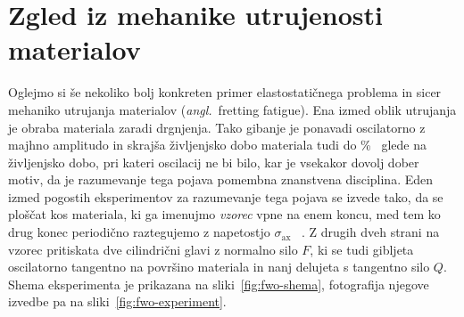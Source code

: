 \documentclass[12pt,a4paper,twoside]{article}
\theoremstyle{definition} %
\theoremstyle{plain} %
\numberwithin{equation}{section}
\newcommand{\sax}{\ensuremath{\sigma_{\text{ax}}}}
\newcommand{\ang}[1]{(\textit{angl.}\ #1)}
\begin{document}
\section{Zgled iz mehanike utrujenosti materialov}
\label{sec:fwo}
Oglejmo si še nekoliko bolj konkreten primer elastostatičnega problema in sicer mehaniko utrujanja
materialov \ang{fretting fatigue}.  Ena izmed oblik utrujanja je obraba materiala zaradi drgnjenja.
Tako gibanje je ponavadi oscilatorno z majhno amplitudo in skrajša življenjsko dobo materiala tudi
do \unit[50]{\%}~\cite{jeung2015crack} glede na življenjsko dobo, pri kateri oscilacij ne bi bilo,
kar je vsekakor dovolj dober motiv, da je razumevanje tega pojava pomembna znanstvena disciplina.
Eden izmed pogostih eksperimentov za razumevanje tega pojava se izvede tako, da se ploščat kos
materiala, ki ga imenujmo \emph{vzorec} vpne na enem koncu, med tem ko drug konec periodično
raztegujemo z napetostjo $\sax$ ~\cite{hojjati2014prediction}. Z drugih dveh strani na vzorec
pritiskata dve cilindrični glavi z normalno silo $F$, ki se tudi gibljeta oscilatorno tangentno na
površino materiala in nanj delujeta s tangentno silo $Q$. Shema eksperimenta je prikazana na
sliki~\ref{fig:fwo-shema}, fotografija njegove izvedbe pa na sliki~\ref{fig:fwo-experiment}.
\end{document}
